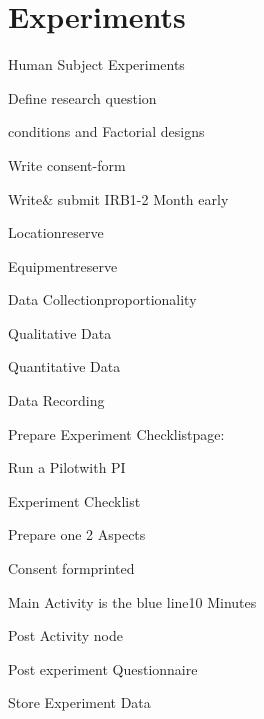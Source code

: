 
\section{Experiments}
\begin{checklist}{Human Subject Experiments}
    \item{Define research question}{}
    \item{conditions and Factorial designs }{\cite{FactorialTB,FactorialWiki}}
        \item{Write consent-form}{}
    \item{Write\& submit IRB}{1-2 Month early}
    \item{Location}{reserve}
    \item{Equipment}{reserve}
    \item{Data Collection}{proportionality}
    \item{Qualitative Data}{}
    \item{Quantitative Data}{}
    \item{Data Recording}{}
    \item{Prepare Experiment Checklist}{page:~\pageref{TAB:EXPR}} %
    \item{Run a Pilot}{with PI}
\end{checklist}


\begin{checklist}{Experiment Checklist}\label{TAB:EXPR}
  \item{Prepare one }{2 Aspects} 
  \item{Consent form}{printed}
  \item{Main Activity is the blue line}{10 Minutes}
  \item{Post Activity node}{}
  \item{Post experiment Questionnaire}{}
  \item{Store Experiment Data}{}
\end{checklist}